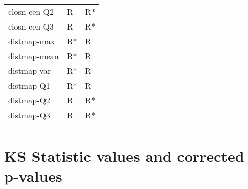 \begin{longtable}{lll}
	closn-cen-Q2                  &      R &   R* \\
	closn-cen-Q3                  &      R &   R* \\
	distmap-max                   &     R* &    R \\
	distmap-mean                  &     R* &    R \\
	distmap-var                   &     R* &    R \\
	distmap-Q1                    &     R* &    R \\
	distmap-Q2                    &      R &   R* \\
	distmap-Q3                    &      R &   R* \\
	\label{tab:results-other-features}
\end{longtable}

\section{KS Statistic values and corrected p-values}

